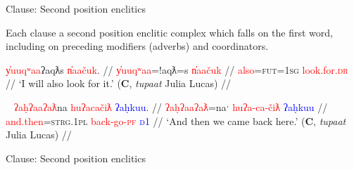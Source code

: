 \begin{frame}{Clause: Second position enclitics}

Each clause a second position enclitic complex which falls on the first word, including on preceding modifiers (adverbs) and coordinators.

\ex[exno=8]
\begingl
\glpreamble \textcolor{red}{y̓uuqʷaa}ʔaqƛs \textcolor{red}{n̓aačuk}. //
\gla \textcolor{red}{y̓uuqʷaa}=!aqƛ=s \textcolor{red}{n̓aačuk}  //
\glb \textcolor{red}{also}=\textsc{fut}=\textsc{1sg} \textcolor{red}{look.for.\textsc{dr}} //
\glft `I will also look for it.' (\textbf{C}, \textit{tupaat} Julia Lucas) //
\endgl \label{ex:2padvpred}
\xe

\ex[exno=9]~
\begingl
\glpreamble \textcolor{red}{ʔaḥʔaaʔaƛ}na \textcolor{red}{huʔacačiƛ} \textcolor{blue}{ʔaḥkuu}. //
\gla \textcolor{red}{ʔaḥʔaaʔaƛ}=naˑ \textcolor{red}{huʔa-ca-čiƛ} \textcolor{blue}{ʔaḥkuu}  //
\glb \textcolor{red}{and.then}=\textsc{strg.1pl} \textcolor{red}{back-go-\textsc{pf}} \textcolor{blue}{\textsc{d1}} //
\glft `And then we came back here.' (\textbf{C}, \textit{tupaat} Julia Lucas) //
\endgl \label{ex:2pconjpred}
\xe

\end{frame}

\begin{frame}{Clause: Second position enclitics}


\begin{table}[h]
\centering
\label{table:2pclitics}
\caption{Template for clausal enclitics}
\end{table}

\end{frame}

